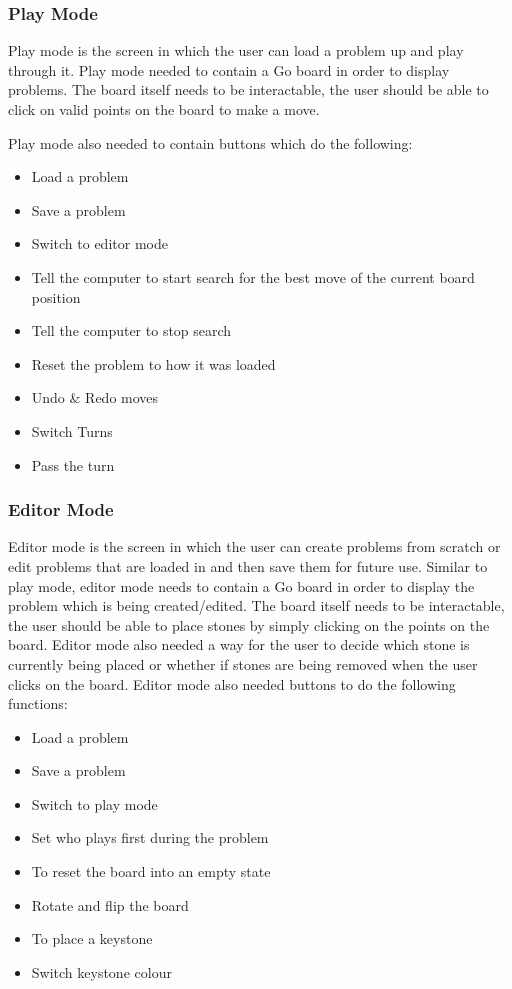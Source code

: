 \documentclass{l4proj}
\begin{document}
\subsubsection{Play Mode}
Play mode is the screen in which the user can load a problem up and play through it. Play mode needed to contain a Go board in order to display problems. The board itself needs to be interactable, the user should be able to click on valid points on the board to make a move.

Play mode also needed to contain buttons which do the following:
\begin{itemize}
\item Load a problem
\item Save a problem
\item Switch to editor mode
\item Tell the computer to start search for the best move of the current board position
\item Tell the computer to stop search
\item Reset the problem to how it was loaded
\item Undo \& Redo moves
\item Switch Turns
\item Pass the turn
\end{itemize}

\subsubsection{Editor Mode}
Editor mode is the screen in which the user can create problems from scratch or edit problems that are loaded in and then save them for future use. Similar to play mode, editor mode needs to contain a Go board in order to display the problem which is being created/edited. The board itself needs to be interactable, the user should be able to place stones by simply clicking on the points on the board. Editor mode also needed a way for the user to decide which stone is currently being placed or whether if stones are being removed when the user clicks on the board.
Editor mode also needed buttons to do the following functions:
\begin{itemize}
\item Load a problem
\item Save a problem
\item Switch to play mode
\item Set who plays first during the problem
\item To reset the board into an empty state
\item Rotate and flip the board
\item To place a keystone
\item Switch keystone colour
\end{itemize}
\end{document}
